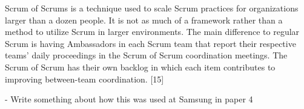 Scrum of Scrums is a technique used to scale Scrum practices for organizations
larger than a dozen people. It is not as much of a framework rather than a
method to utilize Scrum in larger environments. The main difference to regular
Scrum is having Ambassadors in each Scrum team that report their respective
teams' daily proceedings in the Scrum of Scrum coordination meetings. The Scrum
of Scrum has their own backlog in which each item contributes to improving
between-team coordination. [15]

- Write something about how this was used at Samsung in paper 4
